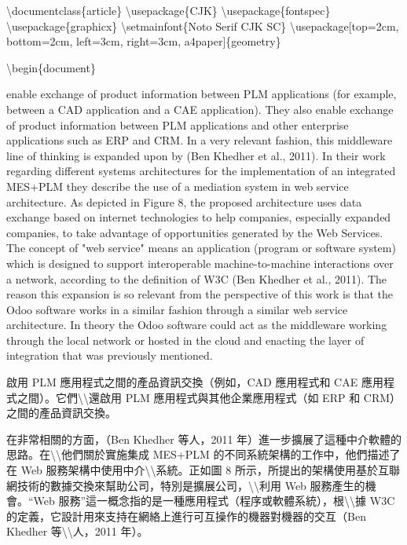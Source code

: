 \textbackslash documentclass\{article\} \textbackslash usepackage\{CJK\}
\textbackslash usepackage\{fontspec\}
\textbackslash usepackage\{graphicx\} \textbackslash setmainfont\{Noto
Serif CJK SC\} \textbackslash usepackage{[}top=2cm, bottom=2cm,
left=3cm, right=3cm, a4paper{]}\{geometry\}

\textbackslash begin\{document\}

enable exchange of product information between PLM applications (for
example, between a CAD application and a CAE application). They also
enable exchange of product information between PLM applications and
other enterprise applications such as ERP and CRM. In a very relevant
fashion, this middleware line of thinking is expanded upon by (Ben
Khedher et al., 2011). In their work regarding different systems
architectures for the implementation of an integrated MES+PLM they
describe the use of a mediation system in web service architecture. As
depicted in Figure 8, the proposed architecture uses data exchange based
on internet technologies to help companies, especially expanded
companies, to take advantage of opportunities generated by the Web
Services. The concept of "web service" means an application (program or
software system) which is designed to support interoperable
machine-to-machine interactions over a network, according to the
definition of W3C (Ben Khedher et al., 2011). The reason this expansion
is so relevant from the perspective of this work is that the Odoo
software works in a similar fashion through a similar web service
architecture. In theory the Odoo software could act as the middleware
working through the local network or hosted in the cloud and enacting
the layer of integration that was previously mentioned.

啟用 PLM 應用程式之間的產品資訊交換（例如，CAD 應用程式和 CAE
應用程式之間）。它們\textbackslash\textbackslash 還啟用 PLM
應用程式與其他企業應用程式（如 ERP 和 CRM）之間的產品資訊交換。

在非常相關的方面，（Ben Khedher 等人，2011
年）進一步擴展了這種中介軟體的思路。在\textbackslash\textbackslash 他們關於實施集成
MES+PLM 的不同系統架構的工作中，他們描述了在 Web
服務架構中使用中介\textbackslash\textbackslash 系統。正如圖 8
所示，所提出的架構使用基於互聯網技術的數據交換來幫助公司，特別是擴展公司，\textbackslash\textbackslash 利用
Web 服務產生的機會。``Web
服務''這一概念指的是一種應用程式（程序或軟體系統），根\textbackslash\textbackslash 據
W3C 的定義，它設計用來支持在網絡上進行可互操作的機器對機器的交互（Ben
Khedher 等\textbackslash\textbackslash 人，2011 年）。

